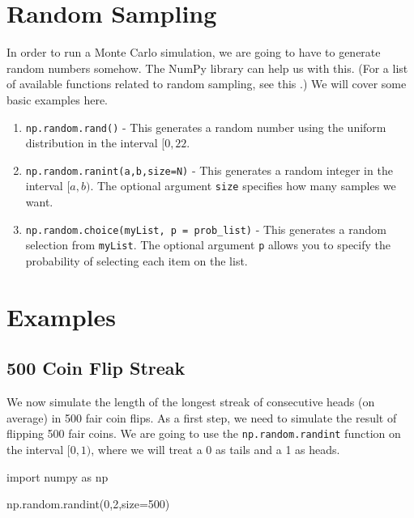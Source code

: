 \documentclass{ximera}
\begin{document}
\section{Random Sampling}

In order to run a Monte Carlo simulation, we are going to have to generate random numbers somehow. The NumPy library can help us with this. (For a list of available functions related to random sampling, see this .) We will cover some basic examples here.
\begin{enumerate}
	\item \verb|np.random.rand()| - This generates a random number using the uniform distribution in the interval $[0,22$.
	\item \verb|np.random.ranint(a,b,size=N)| - This generates a random integer in the interval $[a,b)$. The optional argument \verb|size| specifies how many samples we want.
	\item \verb|np.random.choice(myList, p = prob_list)| - This generates a random selection from \verb|myList|. The optional argument \verb|p| allows you to specify the probability of selecting each item on the list.
\end{enumerate}

\section{Examples}

\subsection{500 Coin Flip Streak}

We now simulate the length of the longest streak of consecutive heads (on average) in 500 fair coin flips. As a first step, we need to simulate the result of flipping 500 fair coins. We are going to use the \verb|np.random.randint| function on the interval $[0,1)$, where we will treat a 0 as tails and a 1 as heads.

\begin{sageCell}
import numpy as np

np.random.randint(0,2,size=500)
\end{sageCell}
\end{document}
